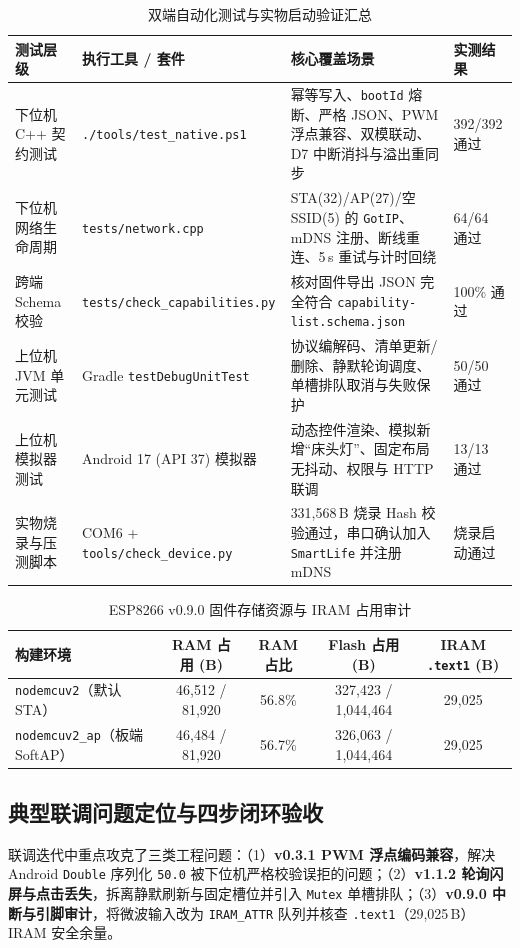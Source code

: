 \documentclass[10.5pt,a4paper]{ctexart}
\newcommand{\code}[1]{{\ttfamily\small\nolinkurl{#1}}}
\begin{document}
\begin{table}[htbp]
\centering
\caption{双端自动化测试与实物启动验证汇总}
\label{tab:test-summary}
\footnotesize
\begin{tabularx}{\textwidth}{p{2.6cm} p{4.2cm} Y p{1.9cm}}
\toprule
\textbf{测试层级} & \textbf{执行工具 / 套件} & \textbf{核心覆盖场景} & \textbf{实测结果} \\
\midrule
下位机 C++ 契约测试 & \code{./tools/test_native.ps1} & 幂等写入、\code{bootId} 熔断、严格 JSON、PWM 浮点兼容、双模联动、D7 中断消抖与溢出重同步 & 392/392 通过 \\
下位机网络生命周期 & \code{tests/network.cpp} & STA(32)/AP(27)/空 SSID(5) 的 \code{GotIP}、mDNS 注册、断线重连、5\,s 重试与计时回绕 & 64/64 通过 \\
跨端 Schema 校验 & \code{tests/check_capabilities.py} & 核对固件导出 JSON 完全符合 \code{capability-list.schema.json} & 100\% 通过 \\
上位机 JVM 单元测试 & Gradle \code{testDebugUnitTest} & 协议编解码、清单更新/删除、静默轮询调度、单槽排队取消与失败保护 & 50/50 通过 \\
上位机模拟器测试 & Android 17 (API 37) 模拟器 & 动态控件渲染、模拟新增“床头灯”、固定布局无抖动、权限与 HTTP 联调 & 13/13 通过 \\
实物烧录与压测脚本 & COM6 + \code{tools/check_device.py} & 331,568\,B 烧录 Hash 校验通过，串口确认加入 \code{SmartLife} 并注册 mDNS & 烧录启动通过 \\
\bottomrule
\end{tabularx}
\end{table}

\begin{table}[htbp]
\centering
\caption{ESP8266 v0.9.0 固件存储资源与 IRAM 占用审计}
\label{tab:mem-audit}
\footnotesize
\begin{tabular}{lcccc}
\toprule
\textbf{构建环境} & \textbf{RAM 占用 (B)} & \textbf{RAM 占比} & \textbf{Flash 占用 (B)} & \textbf{IRAM \texttt{.text1} (B)} \\
\midrule
\code{nodemcuv2}（默认 STA） & 46,512 / 81,920 & 56.8\% & 327,423 / 1,044,464 & 29,025 \\
\code{nodemcuv2_ap}（板端 SoftAP） & 46,484 / 81,920 & 56.7\% & 326,063 / 1,044,464 & 29,025 \\
\bottomrule
\end{tabular}
\end{table}

\subsection{典型联调问题定位与四步闭环验收}
联调迭代中重点攻克了三类工程问题：（1）\textbf{v0.3.1 PWM 浮点编码兼容}，解决 Android \code{Double} 序列化 \code{50.0} 被下位机严格校验误拒的问题；（2）\textbf{v1.1.2 轮询闪屏与点击丢失}，拆离静默刷新与固定槽位并引入 \code{Mutex} 单槽排队；（3）\textbf{v0.9.0 中断与引脚审计}，将微波输入改为 \code{IRAM_ATTR} 队列并核查 \code{.text1}（29,025\,B）IRAM 安全余量。
\end{document}
